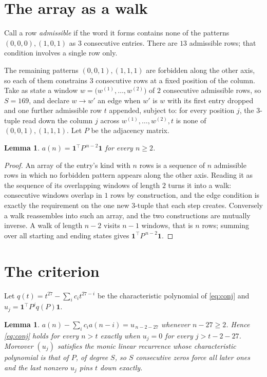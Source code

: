 \documentclass[11pt,a4paper]{article}
\theoremstyle{plain}
\newtheorem{lemma}[theorem]{Lemma}
\theoremstyle{definition}
\begin{document}
\section{The array as a walk}

Call a row \emph{admissible} if the word it forms contains none of the patterns
$(0,0,0), (1,0,1)$ as $3$ consecutive entries. There are $13$ admissible rows; that condition
involves a single row only.

The remaining patterns $(0,0,1), (1,1,1)$ are forbidden along the other axis, so each of them
constrains $3$ consecutive rows at a fixed position of the column. Take as state a
window $w=\bigl(w^{(1)},\dots,w^{(2)}\bigr)$ of $2$ consecutive admissible
rows, so $S=169$, and declare $w\to w'$ an edge when $w'$ is $w$ with its first entry
dropped and one further admissible row $t$ appended, subject to: for every position
$j$, the $3$-tuple read down the column $j$ across $w^{(1)},\dots,w^{(2)},t$
is none of $(0,0,1), (1,1,1)$. Let $P$ be the adjacency matrix.

\begin{lemma}\label{lem:walk}
$a(n)=\mathbf{1}^{\!\top}P^{\,n-2}\mathbf{1}$ for every $n\ge2$.
\end{lemma}

\begin{proof}
An array of the entry's kind with $n$ rows is a sequence of $n$ admissible rows in
which no forbidden pattern appears along the other axis. Reading it as the sequence of its
overlapping windows of length $2$ turns it into a walk: consecutive windows overlap in
$1$ rows by construction, and the edge condition is exactly the requirement on the one
new $3$-tuple that each step creates. Conversely a walk reassembles into such an array,
and the two constructions are mutually inverse. A walk of length $n-2$ visits $n-1$
windows, that is $n$ rows; summing over all starting and ending states gives
$\mathbf{1}^{\!\top}P^{\,n-2}\mathbf{1}$.
\end{proof}

\section{The criterion}

Let $q(t)=t^{27}-\sum_i c_i t^{27-i}$ be the characteristic polynomial of
\eqref{eq:conj} and $u_j=\mathbf{1}^{\!\top}P^{j}q(P)\mathbf{1}$.

\begin{lemma}\label{lem:crit}
$a(n)-\sum_i c_i a(n-i)=u_{\,n-2-27}$ whenever $n-27\ge2$. Hence
\eqref{eq:conj} holds for every $n>t$ exactly when $u_j=0$ for every
$j>t-2-27$. Moreover $(u_j)$ satisfies the monic linear recurrence whose
characteristic polynomial is that of $P$, of degree $S$, so $S$ consecutive zeros force all
later ones and the last nonzero $u_j$ pins $t$ down exactly.
\end{lemma}
\end{document}
